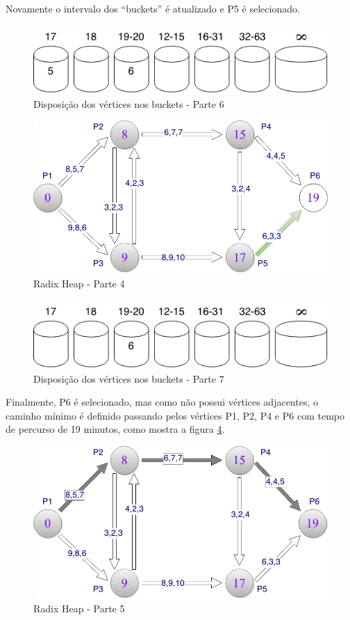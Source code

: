 Novamente o intervalo dos ``buckets'' é atualizado e P5 é selecionado.
\begin{figure}[htbp]
\centering
 \includegraphics[width=.50\textwidth]{chapters/fig/buckets6.png}
\caption{Disposição dos vértices nos buckets - Parte 6}
\label{fig:buckets6}
\end{figure}
\FloatBarrier
\begin{figure}[htbp]
\centering
 \includegraphics[width=.50\textwidth]{chapters/fig/limitesup4.png}
\caption{Radix Heap - Parte 4}
\label{fig:limitesup4}
\end{figure}
\FloatBarrier
\begin{figure}[htbp]
\centering
 \includegraphics[width=.50\textwidth]{chapters/fig/buckets7.png}
\caption{Disposição dos vértices nos buckets - Parte 7}
\label{fig:buckets7}
\end{figure}
\FloatBarrier

Finalmente, P6 é selecionado, mas como não possui vértices adjacentes, o caminho mínimo é definido passando
pelos vértices P1, P2, P4 e P6 com tempo de percurso de 19 minutos, como mostra a figura \ref{fig:limitesup5}.

\begin{figure}[htbp]
\centering
 \includegraphics[width=.50\textwidth]{chapters/fig/limitesup5.png}
\caption{Radix Heap - Parte 5}
\label{fig:limitesup5}
\end{figure}
\FloatBarrier

